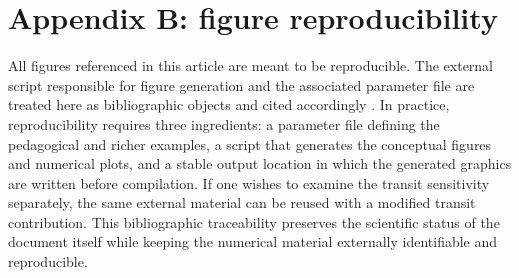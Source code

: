 \documentclass{article}
\begin{document}
\section{Appendix B: figure reproducibility}
\label{sec:appendix-figures}

All figures referenced in this article are meant to be reproducible. The external script responsible for figure generation and the associated parameter file are treated here as bibliographic objects and cited accordingly \cite{theory-figure-script,theory-figure-params}. In practice, reproducibility requires three ingredients: a parameter file defining the pedagogical and richer examples, a script that generates the conceptual figures and numerical plots, and a stable output location in which the generated graphics are written before compilation. If one wishes to examine the transit sensitivity separately, the same external material can be reused with a modified transit contribution. This bibliographic traceability preserves the scientific status of the document itself while keeping the numerical material externally identifiable and reproducible.



\end{document}
